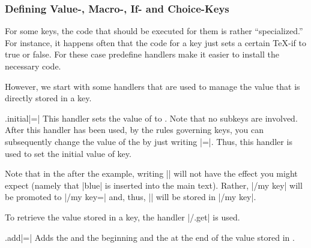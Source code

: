 \subsubsection{Defining Value-, Macro-, If- and Choice-Keys}

For some keys, the code that should be executed for them is rather
``specialized.'' For instance, it happens often that the code for a
key just sets a certain \TeX-if to true or false. For these case
predefine handlers make it easier to install the necessary code.

However, we start with some handlers that are used to manage the value
that is directly stored in a key.

\begin{handler}{{.initial}|=|}
  This handler sets the value of  to . Note that
  no subkeys are involved. After this handler has been used, by the
  rules governing keys, you can subsequently change the value of the
   by just writing |=|. Thus, this
  handler is used to set the initial value of key.

\begin{codeexample}
\end{codeexample}

  Note that in the after the example, writing || will not
  have the effect you might expect (namely that |blue| is inserted
  into the main text). Rather, |/my key| will be promoted to
  |/my key=\pgfkeysnovalue| and, thus, |\pgfkeysnovalue| will be
  stored in |/my key|.

  To retrieve the value stored in a key, the handler |/.get| is used.
\end{handler}


\begin{handler}{{.add}|=|}
  Adds the  and the beginning and the  at the end of the value stored in .
\end{handler}

